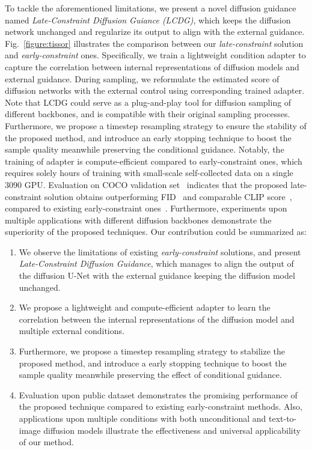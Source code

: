 \documentclass{article}
\begin{document}
To tackle the aforementioned limitations, we present a novel diffusion guidance named \textit{Late-Constraint Diffusion Guiance (LCDG)}, which keeps the diffusion network unchanged and regularize its output to align with the external guidance. Fig.~\ref{figure:tissor} illustrates the comparison between our \textit{late-constraint} solution and \textit{early-constraint} ones. Specifically, we train a lightweight condition adapter to capture the correlation between internal representations of diffusion models and external guidance. During sampling, we reformulate the estimated score of diffusion networks with the external control using corresponding trained adapter. Note that LCDG could serve as a plug-and-play tool for diffusion sampling of different backbones, and is compatible with their original sampling processes. Furthermore, we propose a timestep resampling strategy to ensure the stability of the proposed method, and introduce an early stopping technique to boost the sample quality meanwhile preserving the conditional guidance. Notably, the training of adapter is compute-efficient compared to early-constraint ones, which requires solely hours of training with small-scale self-collected data on a single 3090 GPU. Evaluation on COCO validation set~\cite{lin2014microsoft} indicates that the proposed late-constraint solution obtains outperforming FID~\cite{NIPS2017_8a1d6947} and comparable CLIP score~\cite{radford2021learning}, compared to existing early-constraint ones~\cite{mou2023t2i, zhang2023adding, rombach2022high}. Furthermore, experiments upon multiple applications with different diffusion backbones demonstrate the superiority of the proposed techniques. Our contribution could be summarized as:
\begin{enumerate}
\setlength{\itemsep}{0pt}
  \setlength{\parsep}{0pt}
  \setlength{\parskip}{0pt}
 \item We observe the limitations of existing \textit{early-constraint} solutions, and present \textit{Late-Constraint Diffusion Guidance}, which manages to align the output of the diffusion U-Net with the external guidance keeping the diffusion model unchanged.
  \item We propose a lightweight and compute-efficient adapter to learn the correlation between the internal representations of the diffusion model and multiple external conditions.
  \item Furthermore, we propose a timestep resampling strategy to stabilize the proposed method, and introduce a early stopping technique to boost the sample quality meanwhile preserving the effect of conditional guidance.
  \item Evaluation upon public dataset demonstrates the promising performance of the proposed technique compared to existing early-constraint methods. Also, applications upon multiple conditions with both unconditional and text-to-image diffusion models illustrate the effectiveness and universal applicability of our method.
\end{enumerate}
\end{document}
